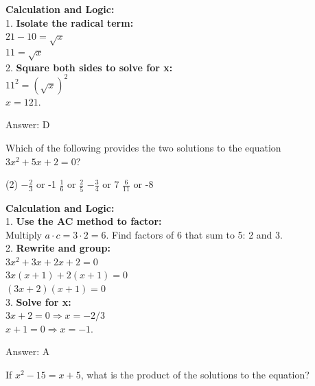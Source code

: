 \documentclass[11pt,paper=a4,answers]{exam}
\begin{document}
\begin{questions}
\begin{solution}
\textbf{Calculation and Logic:} \\
1. \textbf{Isolate the radical term:} \\
   $21 - 10 = \sqrt{x}$ \\
   $11 = \sqrt{x}$ \\
2. \textbf{Square both sides to solve for x:} \\
   $11^2 = (\sqrt{x})^2$ \\
   $x = 121$.

\vspace{30pt}

Answer: \colorbox{yellow!100}{D}
\end{solution}

\vspace{60pt}

\question
Which of the following provides the two solutions to the equation $3x^2 + 5x + 2 = 0$?
\begin{tasks}(2)
    \task $-\frac{2}{3}$ or -1
    \task $\frac{1}{6}$ or $\frac{2}{5}$
    \task $-\frac{3}{4}$ or 7
    \task $\frac{6}{11}$ or -8
\end{tasks}

\begin{solution}
\textbf{Calculation and Logic:} \\
1. \textbf{Use the AC method to factor:} \\
   Multiply $a \cdot c = 3 \cdot 2 = 6$. Find factors of 6 that sum to 5: 2 and 3. \\
2. \textbf{Rewrite and group:} \\
   $3x^2 + 3x + 2x + 2 = 0$ \\
   $3x(x + 1) + 2(x + 1) = 0$ \\
   $(3x + 2)(x + 1) = 0$ \\
3. \textbf{Solve for x:} \\
   $3x + 2 = 0 \Rightarrow x = -2/3$ \\
   $x + 1 = 0 \Rightarrow x = -1$.

\vspace{30pt}

Answer: \colorbox{yellow!100}{A}
\end{solution}

\vspace{60pt}

\question
If $x^2 - 15 = x + 5$, what is the product of the solutions to the equation?


\end{questions}
\end{document}
